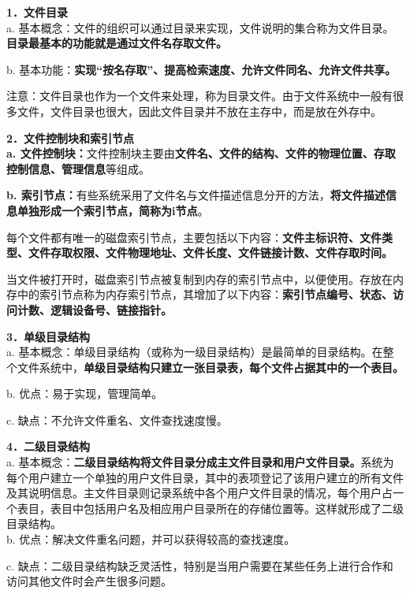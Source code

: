\textbf{{1．文件目录}}\\

a.
基本概念：文件的组织可以通过目录来实现，文件说明的集合称为文件目录。\textbf{目录最基本的功能就是通过文件名存取文件。}

b.
基本功能：\textbf{实现``按名存取''、提高检索速度、允许文件同名、允许文件共享。}

{注意：}{文件目录也作为一个文件来处理，称为目录文件。}{由于文件系统中一般有很多文件，文件目录也很大，因此文件目录并不放在主存中，而是放在外存中。}

\textbf{{2．文件控制块和索引节点}}\\

\textbf{a.
文件控制块：}{文件控制块主要由}\textbf{文件名、文件的结构、文件的物理位置、存取控制信息、管理信息}{等组成。}

\textbf{b.
索引节点：}{有些系统采用了文件名与文件描述信息分开的方法，\textbf{将}}\textbf{文件描述信息单独形成一个索引节点，简称为i节点}{。}

每个文件都有唯一的磁盘索引节点，主要包括以下内容：\textbf{文件主标识符、文件类型、文件存取权限、文件物理地址、文件长度、文件链接计数、文件存取时间。}

当文件被打开时，磁盘索引节点被复制到内存的索引节点中，以便使用。存放在内存中的索引节点称为内存索引节点，其增加了以下内容：\textbf{索引节点编号、状态、访问计数、逻辑设备号、链接指针。}

\textbf{{3．单级目录结构}}\\

a.
基本概念：单级目录结构（或称为一级目录结构）是最简单的目录结构。在整个文件系统中，\textbf{单级目录结构只建立一张目录表，每个文件占据其中的一个表目。}

b. 优点：易于实现，管理简单。

c. 缺点：{不允许文件重名、}{文件查找速度慢。}

\textbf{{4．二级目录结构}}\\
a.
基本概念：\textbf{二级目录结构将文件目录分成主文件目录和用户文件目录。}系统为每个用户建立一个单独的用户文件目录，其中的表项登记了该用户建立的所有文件及其说明信息。主文件目录则记录系统中各个用户文件目录的情况，每个用户占一个表目，表目中包括用户名及相应用户目录所在的存储位置等。这样就形成了二级目录结构。\\

b. 优点：解决文件重名问题，并可以获得较高的查找速度。

c.
缺点：二级目录结构缺乏灵活性，特别是当用户需要在某些任务上进行合作和访问其他文件时会产生很多问题。

